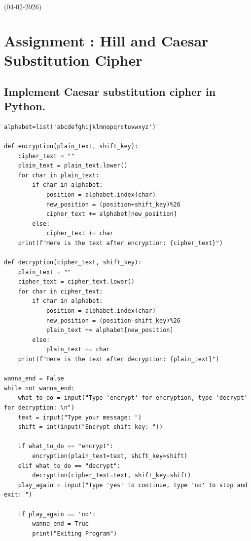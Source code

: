 
{(04-02-2026)}{\thepage}
\section*{\centering Assignment \thesection: Hill and Caesar Substitution Cipher}

\subsection{Implement Caesar substitution cipher in Python.}
\begin{lstlisting}[style=pythonStyle, caption={}]
alphabet=list('abcdefghijklmnopqrstuvwxyz')

def encryption(plain_text, shift_key):
    cipher_text = ""
    plain_text = plain_text.lower()
    for char in plain_text:
        if char in alphabet:
            position = alphabet.index(char)
            new_position = (position+shift_key)%26
            cipher_text += alphabet[new_position]
        else:
            cipher_text += char
    print(f"Here is the text after encryption: {cipher_text}")

def decryption(cipher_text, shift_key):
    plain_text = ""
    cipher_text = cipher_text.lower()
    for char in cipher_text:
        if char in alphabet:    
            position = alphabet.index(char)
            new_position = (position-shift_key)%26
            plain_text += alphabet[new_position]
        else:
            plain_text += char
    print(f"Here is the text after decryption: {plain_text}")

wanna_end = False
while not wanna_end:
    what_to_do = input("Type 'encrypt' for encryption, type 'decrypt' for decryption: \n")
    text = input("Type your message: ")
    shift = int(input("Encrypt shift key: "))

    if what_to_do == "encrypt":
        encryption(plain_text=text, shift_key=shift)
    elif what_to_do == "decrypt":
        decryption(cipher_text=text, shift_key=shift)
    play_again = input("Type 'yes' to continue, type 'no' to stop and exit: ")

    if play_again == 'no':
        wanna_end = True
        print("Exiting Program")
\end{lstlisting}
